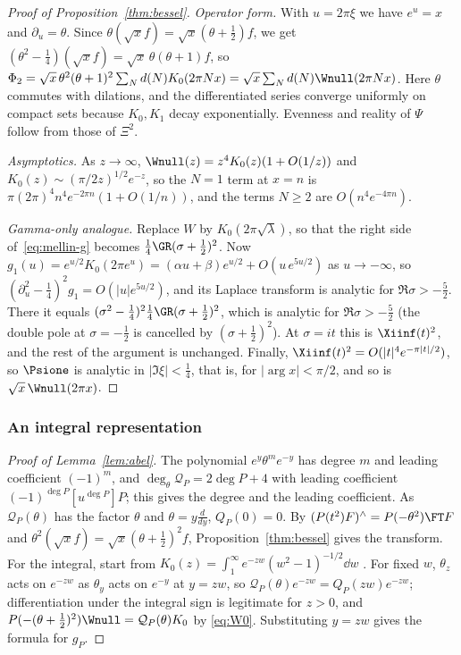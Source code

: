 \begin{proof}[Proof of Proposition~\textup{\ref{thm:bessel}}]
\emph{Operator form.} With $u=2\pi\xi$ we have $e^u=x$ and $\partial_u=\theta$. Since
$\theta(\sqrt x f)=\sqrt x(\theta+\frac12)f$, we get $(\theta^2-\frac14)(\sqrt x f)=\sqrt x\,\theta(\theta+1)f$, so
$\Phi_2=\sqrt x\,\theta^2(\theta+1)^2\sum_Nd(N)K_0(2\pi Nx)=\sqrt x\sum_Nd(N)\Wnull(2\pi Nx)$. Here
$\theta$ commutes with dilations, and the differentiated series converge uniformly on compact sets
because $K_0,K_1$ decay exponentially. Evenness and reality of $\Psi$ follow from those of $\Xi^2$.

\emph{Asymptotics.} As $z\to\infty$, $\Wnull(z)=z^4K_0(z)(1+O(1/z))$ and
$K_0(z)\sim(\pi/2z)^{1/2}e^{-z}$, so the $N=1$ term at $x=n$ is $\pi(2\pi)^4n^4e^{-2\pi n}(1+O(1/n))$,
and the terms $N\ge2$ are $O(n^{4}e^{-4\pi n})$.

\emph{Gamma-only analogue.} Replace $W$ by $K_0(2\pi\sqrt\lambda)$, so that the right side
of~\eqref{eq:mellin-g} becomes $\frac14\GR(\sigma+\frac12)^2$. Now
$g_1(u)=e^{u/2}K_0(2\pi e^u)=(\alpha u+\beta)e^{u/2}+O(u\,e^{5u/2})$ as $u\to-\infty$, so
$(\partial_u^2-\frac14)^2g_1=O(\lvert u\rvert e^{5u/2})$, and its Laplace transform is analytic for
$\Re\sigma>-\frac52$. There it equals $(\sigma^2-\frac14)^2\frac14\GR(\sigma+\frac12)^2$, which is analytic for
$\Re\sigma>-\frac52$ (the double pole at $\sigma=-\frac12$ is cancelled by $(\sigma+\frac12)^2$). At
$\sigma=it$ this is $\Xiinf(t)^2$, and the rest of the argument is unchanged. Finally,
$\Xiinf(t)^2=O(\lvert t\rvert^4e^{-\pi\lvert t\rvert/2})$, so $\Psione$ is analytic in
$\lvert\Im\xi\rvert<\frac14$, that is, for $\lvert\arg x\rvert<\pi/2$, and so is $\sqrt x\,\Wnull(2\pi x)$.
\end{proof}

\subsubsection{An integral representation}\label{app:proofs-hermite}
\begin{proof}[Proof of Lemma~\textup{\ref{lem:abel}}]
The polynomial $e^y\theta^me^{-y}$ has degree $m$ and leading coefficient $(-1)^m$, and $\deg_\theta\mathcal Q_P=2\deg P+4$ with leading
coefficient $(-1)^{\deg P}[u^{\deg P}]P$; this gives the degree and the leading coefficient. As $\mathcal Q_P(\theta)$ has the factor $\theta$
and $\theta=y\frac{d}{dy}$, $Q_P(0)=0$. By $(P(t^2)F)^\wedge=P(-\theta^2)\FT F$ and $\theta^2(\sqrt xf)=\sqrt x(\theta+\frac12)^2f$,
Proposition~\ref{thm:bessel} gives the transform. For the integral, start from $K_0(z)=\int_1^\infty e^{-zw}(w^2-1)^{-1/2}\dd w$
\cite[10.32.8]{DLMF}. For fixed $w$, $\theta_z$ acts on $e^{-zw}$ as $\theta_y$ acts on $e^{-y}$ at $y=zw$, so
$\mathcal Q_P(\theta)e^{-zw}=Q_P(zw)e^{-zw}$; differentiation under the integral sign is legitimate for $z>0$, and
$P(-(\theta+\frac12)^2)\Wnull=\mathcal Q_P(\theta)K_0$ by \eqref{eq:W0}. Substituting $y=zw$ gives the formula for $g_P$.
\end{proof}

